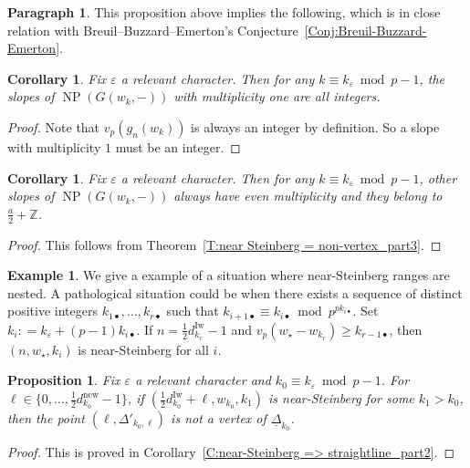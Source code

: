 \documentclass[12pt]{amsart}
\newtheorem{corollary}[subsection]{Corollary}
\newtheorem{proposition}[subsection]{Proposition}
\theoremstyle{definition}
\newtheorem{example}[subsection]{Example}
\newtheorem{para}[subsection]{Paragraph}
\numberwithin{equation}{subsection}
\def\ZZ{\mathbb{Z}}
\DeclareMathOperator{\NP}{NP}
\newcommand{\new}{\mathrm{new}}
\newcommand{\Iw}{\mathrm{Iw}}
\begin{document}
\begin{para}
\label{P:para_164}
This proposition above implies the following, which is in close relation with Breuil--Buzzard--Emerton's Conjecture~\ref{Conj:Breuil-Buzzard-Emerton}.
\end{para}
\begin{corollary}
\label{C:integrality of slopes of G_part1}
Fix $\varepsilon$ a relevant character. Then for any $k \equiv k_\varepsilon  \bmod p-1$, the slopes of $\NP(G(w_k, - ))$ with multiplicity one are all integers.
\end{corollary}
\begin{proof}
Note that $v_p(g_n(w_k))$ is always an integer by definition. So a slope with multiplicity $1$ must be an integer.
\end{proof}

\begin{corollary}
\label{C:integrality of slopes of G_part2}
Fix $\varepsilon$ a relevant character. Then for any $k \equiv k_\varepsilon  \bmod p-1$, other slopes of $\NP(G(w_k, - ))$ always have even multiplicity and they belong to $\frac a2 +\ZZ$.
\end{corollary}
\begin{proof}
This follows from Theorem~\ref{T:near Steinberg = non-vertex_part3}.
\end{proof}

\begin{example}
\label{Ex:pathological Steinberg range}
We give a example of a situation where near-Steinberg ranges are nested. 
A pathological situation could be when there exists a sequence of distinct positive integers $k_{1\bullet},\dots, k_{r\bullet}$ such that $k_{{i+1}\bullet} \equiv k_{i\bullet} \bmod{p^{pk_{i\bullet}}}$. Set $k_i: =k_\varepsilon + (p-1)k_{i\bullet}$. If $n = \frac 12 d_{k_r}^\Iw-1$ and $v_p(w_\star - w_{k_r}) \geq k_{r-1\bullet}$, then $(n,w_\star, k_i)$ is near-Steinberg for all $i$.
\end{example}

\begin{proposition}
\label{P:vertices of Deltak_part1}
Fix $\varepsilon$ a relevant character and $k_0 \equiv k_\varepsilon \bmod p-1$.
For $\ell \in\{0, \dots, \frac12d_{k_0}^\new-1\}$, if $(\frac 12d_{k_0}^\Iw + \ell, w_{k_0}, k_1)$ is near-Steinberg for some $k_1 > {k_0}$, then the point $(\ell, \Delta'_{{k_0},\ell})$ is not a vertex of $\underline \Delta_{k_0}$.
\end{proposition}
\begin{proof}
This is proved in Corollary~\ref{C:near-Steinberg => straightline_part2}.
\end{proof}
\end{document}
